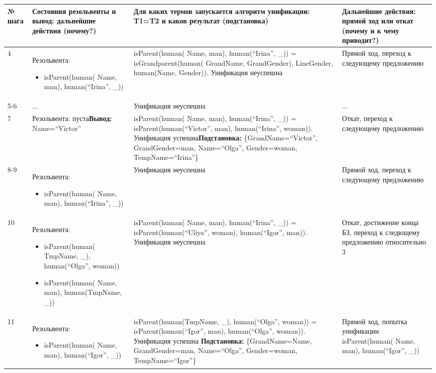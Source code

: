 \documentclass[14pt,a4paper]{scrreprt}
\begin{document}
\begin{table}[H]
	\begin{tabular}{|p{0.8cm\small}|p{4.7cm\small}|p{5.7cm\small}|p{4cm\small}|}	
		\hline
		№ шага & Состояния резольвенты и вывод: дальнейшие действия (почему?) & Для каких термов запускается алгоритм унификации: T1=T2 и каков результат (подстановка) & Дальнейшие действия: прямой ход или откат (почему и к чему приводит?)\\
		\hline
		4 & Резольвента:\begin{itemize} \item isParent(human(
			Name, man), human(``Irina'', \_))\end{itemize} & isParent(human(
		Name, man), human(``Irina'', \_)) = isGrandparent(human(
		GrandName, GrandGender), LineGender, human(Name, Gender)). Унификация неуспешна & Прямой ход, переход к следующему предложению\\
		\hline
		5-6 & ... & Унификация неуспешна & ...\\
		\hline
		7 & Резольвента: пуста\linebreak \textbf{Вывод:} Name=``Victor'' & isParent(human(
		Name, man), human(``Irina'', \_)) = isParent(human(``Victor'', man), human(``Irina'', woman)). Унификация успешна\linebreak \textbf{Подстановка:} \{GrandName=``Victor'', GrandGender=man, Name=``Olga'', Gender=woman, TempName=``Irina''\} & Откат, переход к следующему предложению\\
		\hline
		8-9 & Резольвента: \begin{itemize} \item isParent(human(
			Name, man), human(``Irina'', \_))\end{itemize} & Унификация неуспешна & Прямой ход, переход к следующему предложению\\
		\hline
		10 & Резольвента:\begin{itemize} \item isParent(human(
			TmpName, \_), human(``Olga'', woman)) \item isParent(human(
			Name, man), human(TmpName, \_))\end{itemize} & isParent(human(
		Name, man), human(``Irina'', \_)) = isParent(human(``Uliya'', woman), human(``Igor'', man)). Унификация неуспешна & Откат, достижение конца БЗ, переход к следющему предложению относительно 3\\
		\hline
		11 & Резольвента:\begin{itemize} \item isParent(human(
			Name, man), human(``Igor'', \_))\end{itemize} & isParent(human(TmpName, \_), human(``Olga'', woman)) = isParent(human(``Igor'', man), human(``Olga'', woman)). Унификация успешна\linebreak
		\textbf{Подстановка:} \{GrandName=Name, GrandGender=man, Name=``Olga'', Gender=woman, TempName=``Igor''\} & Прямой ход, попытка унификации isParent(human(
		Name, man), human(``Igor'', \_))\\
		\hline
	\end{tabular}
\end{table}
\end{document}
